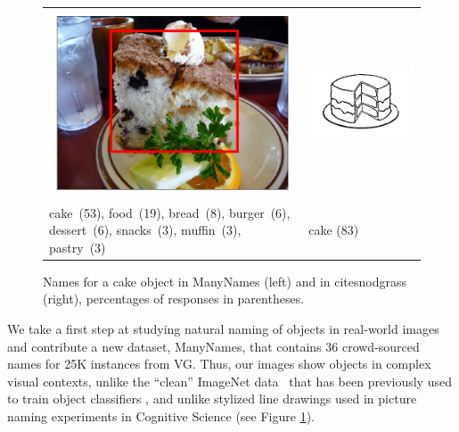 \documentclass[10pt, a4paper]{article}
\newcommand{\vg}{VG\xspace}
\begin{document}
\begin{figure}[tbp]
\scriptsize
\begin{tabular}{p{4.3cm}p{2cm}}
\centering
\includegraphics[scale=0.15]{figures/2390077_1254219_supercat_unique.png} &
\includegraphics[scale=0.4]{figures/snodgrass_vanderwart_cake_042.png}\\
 cake\ (53),  food\ (19), bread\ (8), burger\ (6), dessert\ (6), snacks\ (3), muffin\ (3),  pastry\ (3) & \hspace{.9cm} cake (83)
\end{tabular}
\caption{Names for a cake object in ManyNames (left) and in cite{snodgrass} (right), percentages of responses in parentheses.}
\label{fig:cake}
\end{figure}


We take a first step at studying natural naming of objects in real-world images and contribute a new dataset, ManyNames, that contains 36 crowd-sourced names for 25K instances from \vg.
Thus, our images show objects in complex visual contexts,
unlike the ``clean'' ImageNet data~\cite{imagenet_cvpr09} that has been previously used to train object classifiers \cite{ILSVRC15}, and unlike stylized line drawings used in picture naming experiments in Cognitive Science (see Figure \ref{fig:cake}).
\end{document}
